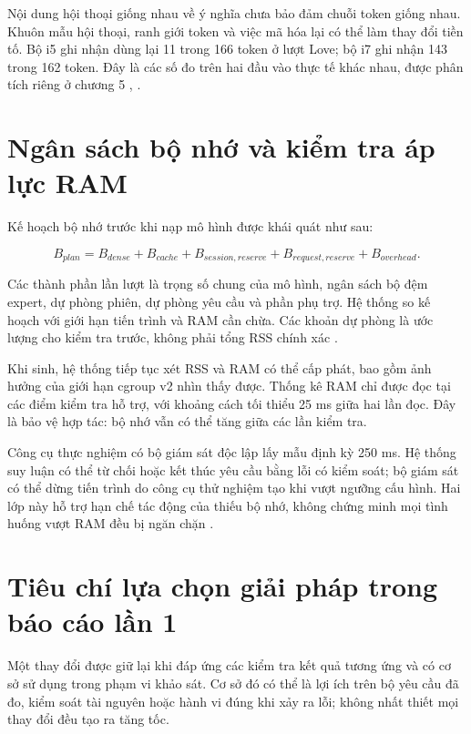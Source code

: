 Nội dung hội thoại giống nhau về ý nghĩa chưa bảo đảm chuỗi token giống nhau. Khuôn mẫu hội thoại, ranh giới token và việc mã hóa lại có thể làm thay đổi tiền tố. Bộ i5 ghi nhận dùng lại 11 trong 166 token ở lượt Love; bộ i7 ghi nhận 143 trong 162 token. Đây là các số đo trên hai đầu vào thực tế khác nhau, được phân tích riêng ở chương 5 \cite{exp_phase1_i5}, \cite{exp_phase1_i7}.

\section{Ngân sách bộ nhớ và kiểm tra áp lực RAM}

Kế hoạch bộ nhớ trước khi nạp mô hình được khái quát như sau:

\begin{equation}
\label{eq:4.3}
B_{plan}=B_{dense}+B_{cache}+B_{session,reserve}+B_{request,reserve}+B_{overhead}.
\end{equation}

Các thành phần lần lượt là trọng số chung của mô hình, ngân sách bộ đệm expert, dự phòng phiên, dự phòng yêu cầu và phần phụ trợ. Hệ thống so kế hoạch với giới hạn tiến trình và RAM cần chừa. Các khoản dự phòng là ước lượng cho kiểm tra trước, không phải tổng RSS chính xác \cite{moe_tierengine_arch}.

Khi sinh, hệ thống tiếp tục xét RSS và RAM có thể cấp phát, bao gồm ảnh hưởng của giới hạn cgroup v2 nhìn thấy được. Thống kê RAM chỉ được đọc tại các điểm kiểm tra hỗ trợ, với khoảng cách tối thiểu 25 ms giữa hai lần đọc. Đây là bảo vệ hợp tác: bộ nhớ vẫn có thể tăng giữa các lần kiểm tra.

Công cụ thực nghiệm có bộ giám sát độc lập lấy mẫu định kỳ 250 ms. Hệ thống suy luận có thể từ chối hoặc kết thúc yêu cầu bằng lỗi có kiểm soát; bộ giám sát có thể dừng tiến trình do công cụ thử nghiệm tạo khi vượt ngưỡng cấu hình. Hai lớp này hỗ trợ hạn chế tác động của thiếu bộ nhớ, không chứng minh mọi tình huống vượt RAM đều bị ngăn chặn \cite{exp_ram_guard_i5}.

\section{Tiêu chí lựa chọn giải pháp trong báo cáo lần 1}

Một thay đổi được giữ lại khi đáp ứng các kiểm tra kết quả tương ứng và có cơ sở sử dụng trong phạm vi khảo sát. Cơ sở đó có thể là lợi ích trên bộ yêu cầu đã đo, kiểm soát tài nguyên hoặc hành vi đúng khi xảy ra lỗi; không nhất thiết mọi thay đổi đều tạo ra tăng tốc.

